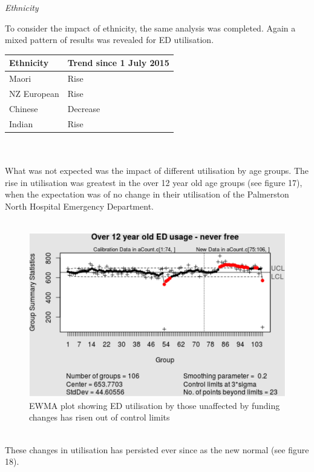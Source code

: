 \documentclass[11pt,a4paper]{article}
\begin{document}
\emph{Ethnicity}


To consider the impact of ethnicity, the same analysis was completed. Again a mixed pattern of results was revealed for ED utilisation.\\


\begin{tabular}{|l|l|}
\hline
        Ethnicity & Trend since 1 July 2015\\
\hline
        Maori & Rise\\
\hline
        NZ European & Rise\\
\hline
        Chinese & Decrease\\
\hline
        Indian & Rise\\
\hline
\end{tabular}
\\
\\
What was not expected was the impact of different utilisation by age groups. The rise in utilisation was greatest in the over 12 year old age groups (see figure 17), when the expectation was of no change in their utilisation of the Palmerston North Hospital Emergency Department.\\
\\
\begin{figure}[htp]
\centering
\includegraphics[scale=0.50]{Over12.png}
\caption{EWMA plot showing ED utilisation by those unaffected by funding changes has risen out of control limits}
\label{Rise in ED utilisation by over 12 years old}
\end{figure}
\\


These changes in utilisation has persisted ever since as the new normal (see figure 18).\\
\\
\end{document}
